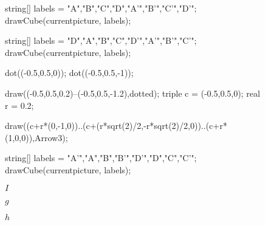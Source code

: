 \documentclass[../key.tex]{subfiles}
\begin{document}
\begin{figure}[h]
	\begin{center}
		\begin{minipage}[b]{0.3\textwidth}
			\centering
			\begin{asy}[width=0.9\textwidth]
				string[] labels = {"A","B","C","D","A'","B'","C'","D'"};
				drawCube(currentpicture, labels);
			\end{asy}
		\end{minipage}
		\hfill
		\begin{minipage}[b]{0.3\textwidth}
			\centering
			\begin{asy}[width=0.9\textwidth]
			string[] labels = {"D","A","B","C","D'","A'","B'","C'"};
			drawCube(currentpicture, labels);
			
			dot((-0.5,0.5,0));
			dot((-0.5,0.5,-1));
			
			draw((-0.5,0.5,0.2)--(-0.5,0.5,-1.2),dotted);
			triple c = (-0.5,0.5,0);
			real r = 0.2;
			
			draw((c+r*(0,-1,0))..(c+(r*sqrt(2)/2,-r*sqrt(2)/2,0))..(c+r*(1,0,0)),Arrow3);
			
			\end{asy}
		\end{minipage}
		\hfill
		\begin{minipage}[b]{0.3\textwidth}
			\centering
			\begin{asy}[width=0.9\textwidth]
				string[] labels = {"A'","A","B","B'","D'","D","C","C'"};
				drawCube(currentpicture, labels);
			\end{asy}
		\end{minipage}
	\end{center}
	\vspace*{-2\baselineskip}
	\begin{center}
		\begin{minipage}[t]{0.3\textwidth}
			\centering
			$I$
		\end{minipage}
		\hfill
		\begin{minipage}[t]{0.3\textwidth}
			\centering
			$g$
		\end{minipage}
		\hfill
		\begin{minipage}[t]{0.3\textwidth}
			\centering
			$h$
		\end{minipage}
	\end{center}
	\vspace*{-2\baselineskip}
	\begin{center}
		\begin{minipage}[t]{\textwidth}
			\label{fig:elements_g_and_h}
		\end{minipage}
	\end{center}
	\vspace*{-2\baselineskip}
\end{figure}
\end{document}
